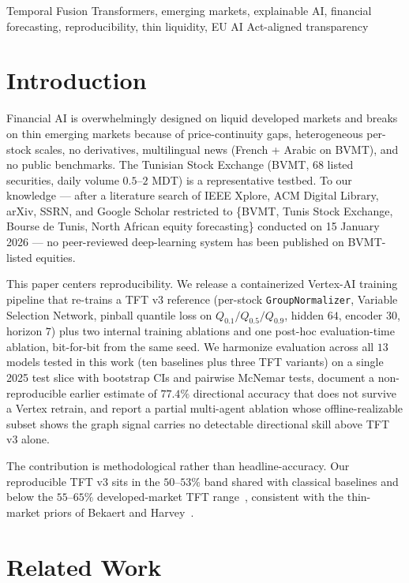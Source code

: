 \documentclass[conference]{IEEEtran}
\begin{document}
\begin{IEEEkeywords}
Temporal Fusion Transformers, emerging markets, explainable AI, financial forecasting, reproducibility, thin liquidity, EU AI Act-aligned transparency
\end{IEEEkeywords}

\section{Introduction}

Financial AI is overwhelmingly designed on liquid developed markets and breaks on thin emerging markets because of price-continuity gaps, heterogeneous per-stock scales, no derivatives, multilingual news (French + Arabic on BVMT), and no public benchmarks. The Tunisian Stock Exchange (BVMT, 68 listed securities, daily volume $0.5$--$2$ MDT) is a representative testbed. To our knowledge --- after a literature search of IEEE Xplore, ACM Digital Library, arXiv, SSRN, and Google Scholar restricted to \{BVMT, Tunis Stock Exchange, Bourse de Tunis, North African equity forecasting\} conducted on 15 January 2026 --- no peer-reviewed deep-learning system has been published on BVMT-listed equities.

This paper centers reproducibility. We release a containerized Vertex-AI training pipeline that re-trains a TFT v3 reference (per-stock \texttt{GroupNormalizer}, Variable Selection Network, pinball quantile loss on $Q_{0.1}/Q_{0.5}/Q_{0.9}$, hidden $64$, encoder $30$, horizon $7$) plus two internal training ablations and one post-hoc evaluation-time ablation, bit-for-bit from the same seed. We harmonize evaluation across all $13$ models tested in this work (ten baselines plus three TFT variants) on a single 2025 test slice with bootstrap CIs and pairwise McNemar tests, document a non-reproducible earlier estimate of $77.4\%$ directional accuracy that does not survive a Vertex retrain, and report a partial multi-agent ablation whose offline-realizable subset shows the graph signal carries no detectable directional skill above TFT v3 alone.

The contribution is methodological rather than headline-accuracy. Our reproducible TFT v3 sits in the $50$--$53\%$ band shared with classical baselines and below the $55$--$65\%$ developed-market TFT range~\cite{IEEEhowto:kopka}, consistent with the thin-market priors of Bekaert and Harvey~\cite{ref:bekaert_harvey,ref:harvey_multiple,ref:harvey_presidential}.

\section{Related Work}\label{sec:related}
\end{document}
